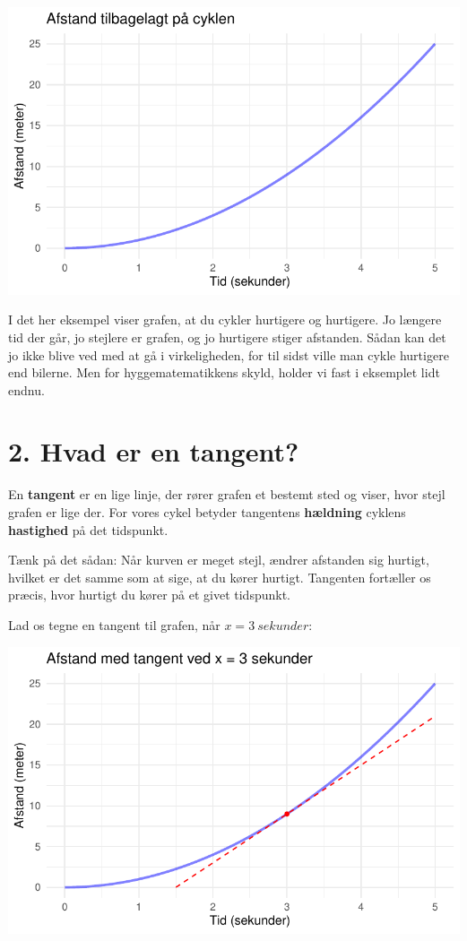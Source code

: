 \documentclass[
  letterpaper,
  DIV=11,
  numbers=noendperiod]{scrreprt}
\begin{document}
\includegraphics{differentialregning_files/figure-pdf/plot-funktion-1.pdf}

I det her eksempel viser grafen, at du cykler hurtigere og hurtigere. Jo
længere tid der går, jo stejlere er grafen, og jo hurtigere stiger
afstanden. Sådan kan det jo ikke blive ved med at gå i virkeligheden,
for til sidst ville man cykle hurtigere end bilerne. Men for
hyggematematikkens skyld, holder vi fast i eksemplet lidt endnu.

\section{2. Hvad er en tangent?}\label{hvad-er-en-tangent}

En \textbf{tangent} er en lige linje, der rører grafen et bestemt sted
og viser, hvor stejl grafen er lige der. For vores cykel betyder
tangentens \textbf{hældning} cyklens \textbf{hastighed} på det
tidspunkt.

Tænk på det sådan: Når kurven er meget stejl, ændrer afstanden sig
hurtigt, hvilket er det samme som at sige, at du kører hurtigt.
Tangenten fortæller os præcis, hvor hurtigt du kører på et givet
tidspunkt.

Lad os tegne en tangent til grafen, når \(x = 3\ sekunder\):

\includegraphics{differentialregning_files/figure-pdf/plot-tangent-1.pdf}
\end{document}
